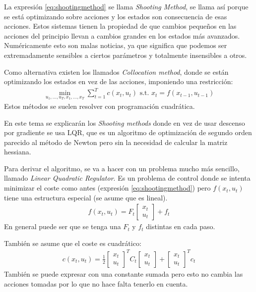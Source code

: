 La expresión \ref{eq:shootingmethod} se llama \textit{Shooting Method}, se llama así porque se
está optimizando sobre acciones y los estados son consecuencia de esas acciones. Estos
sistemas tienen la propiedad de que cambios pequeños en las acciones del principio llevan a
cambios grandes en los estados más avanzados. Numéricamente esto son malas noticias, ya que
significa que podemos ser extremadamente sensibles a ciertos parámetros y totalmente
insensibles a otros.

Como alternativa existen los llamados \textit{Collocation method}, donde se están optimizando los
estados en vez de las acciones, imponiendo una restricción:
\begin{align}
\operatorname { min } _ { u _ { 1 } , \ldots , u _ { T } , x _ { 1 } , \ldots , x _ { T } } \sum _ { t = 1 } ^ { T } c ( x _ { t } , u _ { t } ) \text { s.t. } x _ { t } = f ( x _ { t - 1 } , u _ { t - 1 } )
\end{align}
Estos métodos se suelen resolver con programación cuadrática.

En este tema se explicarán los \textit{Shooting methods} donde en vez de usar descenso por
gradiente se usa LQR, que es un algoritmo de optimización de segundo orden parecido al método
de Newton pero sin la necesidad de calcular la matriz hessiana. 

Para derivar el algoritmo, se va a hacer con un problema mucho más sencillo, llamado
\textit{Linear Quadratic Regulator}. Es un problema de control donde se intenta minimizar el
coste como antes (expresión \ref{eq:shootingmethod}) pero $f(x_t,u_t)$ tiene una estructura especial (se asume que es lineal).
 \begin{align}
     \label{eq:linear}
f ( x _ { t } , u _ { t } ) = F _ { t } \left[ \begin{array} { l } { x _ { t } } \\ { u _ { t } } \end{array} \right] + f _ { t }
\end{align}
En general puede ser que se tenga una $F_t$ y  $f_t$ distintas en cada paso.

También se asume que el coste es cuadrático:
\begin{align}
    \label{eq:quadratic}
c ( x _ { t } , u _ { t } ) = \frac { 1 } { 2 } \left[ \begin{array} { c } { x _ { t } } \\ { u _ { t } } \end{array} \right] ^ { T } C _ { t } \left[ \begin{array} { c } { x _ { t } } \\ { u _ { t } } \end{array} \right] + \left[ \begin{array} { c } { x _ { t } } \\ { u _ { t } } \end{array} \right] ^ { T } c _ { t }
\end{align}
También se puede expresar con una constante sumada pero esto no cambia las acciones tomadas por
lo que no hace falta tenerlo en cuenta.

